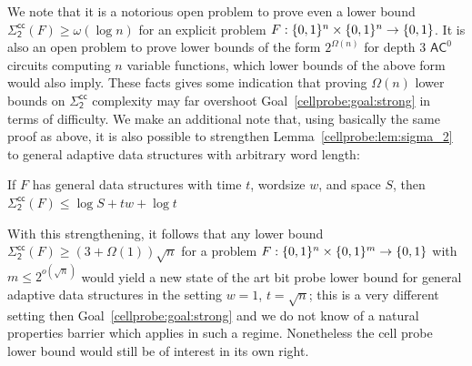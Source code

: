 We note that it is a notorious open problem to prove even a lower bound $\mathsf{\Sigma_2^{cc}}(F) \geq \omega(\log n)$ for an explicit problem $F: \{0,1\}^n \times \{0,1\}^n \to \{0,1\}$. It is also an open problem to prove lower bounds of the form $2^{\Omega(n)}$ for depth 3 $\mathsf{AC}^0$ circuits computing $n$ variable functions, which lower bounds of the above form would also imply. 
These facts gives some indication that proving $\Omega(n)$ lower bounds on $\mathsf{\Sigma_2^{cc}}$ complexity may far overshoot Goal~\ref{cellprobe:goal:strong} in terms of difficulty. 
We make an additional note that, using basically the same proof as above, it is also possible to strengthen Lemma~\ref{cellprobe:lem:sigma_2} to general adaptive data structures with arbitrary word length:
\begin{lemma}
If $F$ has general data structures with time $t$, wordsize $w$, and space $S$, then 
$\mathsf{\Sigma_2^{cc}}(F) \leq \log S + tw + \log t$  
\end{lemma}

With this strengthening, it follows that any lower bound $\mathsf{\Sigma_2^{cc}}(F) \geq (3+\Omega(1)) \sqrt{n}$ for a problem $F: \{0,1\}^n \times \{0,1\}^m \to \{0,1\}$ with $m\leq 2^{o(\sqrt{n})}$ would yield a new state of the art bit probe lower bound for general adaptive data structures in the setting $w=1$, $t = \sqrt{n}$; this is a very different setting then Goal~\ref{cellprobe:goal:strong} and we do not know of a natural properties barrier which applies in such a regime. Nonetheless the cell probe lower bound would still be of interest in its own right.

